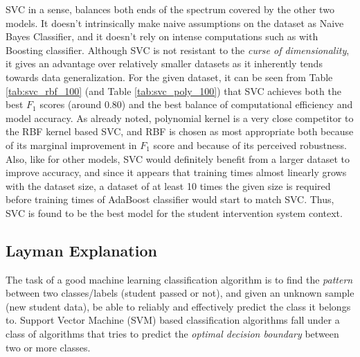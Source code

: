 \documentclass{article}
\begin{document}
	SVC in a sense, balances both ends of the spectrum covered by the other two models. It doesn't intrinsically make naive assumptions on the dataset as Naive Bayes Classifier, and it doesn't rely on intense computations such as with Boosting classifier. Although SVC is not resistant to the \emph{curse of dimensionality}, it gives an advantage over relatively smaller datasets as it inherently tends towards data generalization. For the given dataset, it can be seen from Table \ref{tab:svc_rbf_100} (and Table \ref{tab:svc_poly_100}) that SVC achieves both the best $F_1$ scores (around 0.80) and the best balance of computational efficiency and model accuracy. As already noted, polynomial kernel is a very close competitor to the RBF kernel based SVC, and RBF is chosen as most appropriate both because of its marginal improvement in $F_1$ score and because of its perceived robustness. Also, like for other models, SVC would definitely benefit from a larger dataset to improve accuracy, and since it appears that training times almost linearly grows with the dataset size, a dataset of at least 10 times the given size is required before training times of AdaBoost classifier would start to match SVC. Thus, SVC is found to be the best model for the student intervention system context.
	
	\subsection{Layman Explanation}
	The task of a good machine learning classification algorithm is to find the \emph{pattern} between two classes/labels (student passed or not), and given an unknown sample (new student data), be able to reliably and effectively predict the class it belongs to. Support Vector Machine (SVM) based classification algorithms fall under a class of algorithms that tries to predict the \emph{optimal decision boundary} between two or more classes.
	
\end{document}

